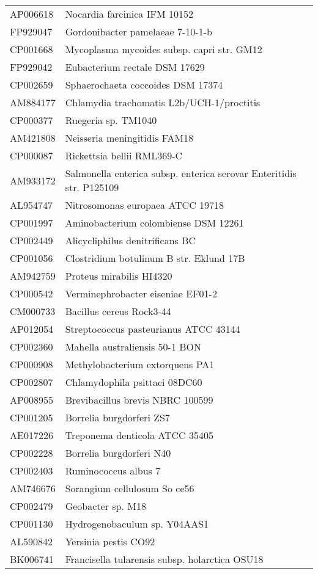 \begin{longtable}{ll}
AP006618 & Nocardia farcinica IFM 10152\\
FP929047 & Gordonibacter pamelaeae 7-10-1-b\\
CP001668 & Mycoplasma mycoides subsp. capri str. GM12\\
FP929042 & Eubacterium rectale DSM 17629\\
CP002659 & Sphaerochaeta coccoides DSM 17374\\
AM884177 & Chlamydia trachomatis L2b/UCH-1/proctitis\\
CP000377 & Ruegeria sp. TM1040\\
AM421808 & Neisseria meningitidis FAM18\\
CP000087 & Rickettsia bellii RML369-C\\
AM933172 & Salmonella enterica subsp. enterica serovar Enteritidis str. P125109\\
AL954747 & Nitrosomonas europaea ATCC 19718\\
CP001997 & Aminobacterium colombiense DSM 12261\\
CP002449 & Alicycliphilus denitrificans BC\\
CP001056 & Clostridium botulinum B str. Eklund 17B\\
AM942759 & Proteus mirabilis HI4320\\
CP000542 & Verminephrobacter eiseniae EF01-2\\
CM000733 & Bacillus cereus Rock3-44\\
AP012054 & Streptococcus pasteurianus ATCC 43144\\
CP002360 & Mahella australiensis 50-1 BON\\
CP000908 & Methylobacterium extorquens PA1\\
CP002807 & Chlamydophila psittaci 08DC60\\
AP008955 & Brevibacillus brevis NBRC 100599\\
CP001205 & Borrelia burgdorferi ZS7\\
AE017226 & Treponema denticola ATCC 35405\\
CP002228 & Borrelia burgdorferi N40\\
CP002403 & Ruminococcus albus 7\\
AM746676 & Sorangium cellulosum So ce56\\
CP002479 & Geobacter sp. M18\\
CP001130 & Hydrogenobaculum sp. Y04AAS1\\
AL590842 & Yersinia pestis CO92\\
BK006741 & Francisella tularensis subsp. holarctica OSU18\\

\end{longtable}
